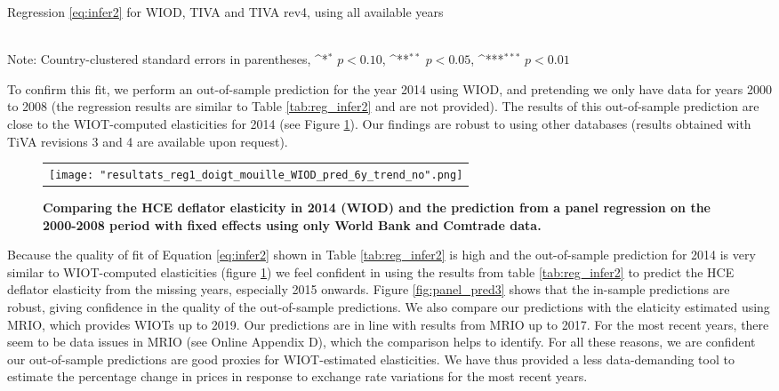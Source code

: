 \documentclass[11pt,a4paper]{paper} %
\begin{document}
\begin{table}[htbp]\centering
	\def\sym#1{\ifmmode^{#1}\else\(^{#1}\)\fi}
	\caption{Regression \ref{eq:infer2} for WIOD, TIVA and TIVA rev4, using all available years }

\\
Note: Country-clustered standard errors in parentheses, \sym{*} \(p<0.10\), \sym{**} \(p<0.05\), \sym{***} \(p<0.01\)
\label{tab:reg_infer2}
\end{table}

To confirm this fit, we perform an out-of-sample prediction for the year 2014 using WIOD, and pretending we only have data for years 2000 to 2008 (the regression results are similar to Table \ref{tab:reg_infer2} and are not provided).
The results of this out-of-sample prediction are close to the WIOT-computed elasticities for 2014  (see Figure \ref{fig:panel_pred2}). 
Our findings are robust to using other databases (results obtained with TiVA revisions 3 and 4 are available upon request).

\begin{figure}[!h]
	\centering
	\caption{\footnotesize{\textbf{Comparing the HCE deflator elasticity in 2014 (WIOD) and the prediction from a panel regression on the 2000-2008 period with fixed effects using only World Bank and Comtrade data. }}}
	\begin{tabular}{c}
		\texttt{[image: "resultats\_reg1\_doigt\_mouille\_WIOD\_pred\_6y\_trend\_no".png]}\\
	\end{tabular}
	\label{fig:panel_pred2}
\end{figure}

Because the quality of fit of Equation \ref{eq:infer2} shown in Table \ref{tab:reg_infer2} is high and the out-of-sample prediction for 2014 is very similar to  WIOT-computed elasticities (figure \ref{fig:panel_pred2}) we feel confident in using the results from table \ref{tab:reg_infer2} to predict the HCE deflator elasticity from the missing years, especially 2015 onwards.
Figure \ref{fig:panel_pred3} shows that the in-sample predictions are robust, giving confidence in the quality of the out-of-sample predictions.
We also compare our predictions with the elaticity estimated using MRIO, which provides WIOTs up to 2019. 
Our predictions are in line with results from MRIO up to 2017. For the most recent years, there seem to be data issues in MRIO (see Online Appendix D), which the comparison helps to identify.
For all these reasons, we are confident our out-of-sample predictions are good proxies for WIOT-estimated elasticities.
We have thus provided a less data-demanding tool to estimate the percentage change in prices in response to exchange rate variations for the most recent years.
\end{document}

